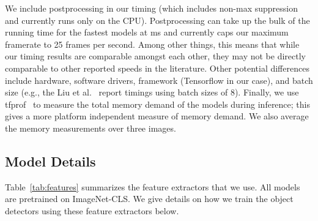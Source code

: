 \documentclass[10pt,twocolumn,letterpaper]{article}
\begin{document}
We include postprocessing in our timing (which includes non-max suppression and currently runs only on the CPU).  Postprocessing can take up the bulk of the running time for the fastest models at ms and currently caps our maximum framerate to 25 frames per second.
Among other things, this means that while our timing results are comparable amongst each other, they may not be directly comparable to other reported speeds in the literature.
Other potential differences include hardware, software drivers, framework (Tensorflow in our case), and batch size (e.g., the Liu et al.~\cite{liu2015ssd} report timings using batch sizes of 8). 
Finally, we use tfprof~\cite{pan2016tfprof} to measure the total memory demand of the models during inference; this gives a more platform independent measure of memory demand. We also average the memory measurements over three images.

\subsection{Model Details}\label{sec:model_details}

    
Table~\ref{tab:features} summarizes the feature extractors that we use.
All models are pretrained on ImageNet-CLS.
We give details on how we train the object detectors using these feature extractors below.
\end{document}
